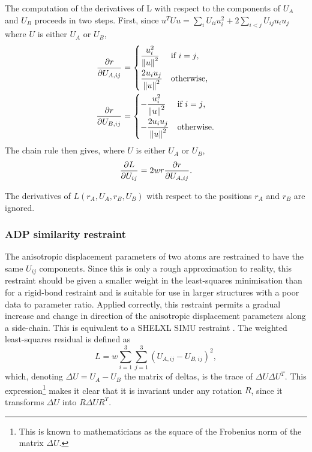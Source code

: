 \documentclass[pdf]{iucr}
\begin{document}
The computation of the derivatives of L with respect to the components of $U_A$ and $U_B$ proceeds in two steps. First, since $u^T U u = \sum_i U_{ii} u_i^2 + 2\sum_{i<j} U_{ij}u_i u_j$ where $U$ is either $U_A$ or $U_B$, 
\begin{align}
\frac{\partial r}{\partial U_{A,ij}} &= \begin{cases}
 \displaystyle \frac{u_i^2}{\left\| u \right\|^2} & \text{if $i=j$,}\\[1em]
 \displaystyle \frac{2u_i u_j}{\left\| u \right\|^2} & \text{otherwise,}
 \end{cases}\\
\frac{\partial r}{\partial U_{B,ij}} &= \begin{cases}
 \displaystyle -\frac{u_i^2}{\left\| u \right\|^2} & \text{if $i=j$,}\\[1em]
 \displaystyle -\frac{2u_i u_j}{\left\| u \right\|^2} & \text{otherwise.}
 \end{cases}
\end{align}
The chain rule then gives, where $U$ is either $U_A$ or $U_B$,
\begin{equation}
\frac{\partial L}{\partial U_{ij}} = 2wr \frac{\partial r}{\partial U_{A,ij}}.
\end{equation}

The derivatives of $L(r_A, U_A, r_B, U_B)$ with respect to the positions $r_A$ and $r_B$ are ignored.

\subsubsection{ADP similarity restraint}
\label{ADP:similarity}
The anisotropic displacement parameters of two atoms are restrained to have the same $U_{ij}$ components. Since this is only a rough approximation to reality, this restraint should be given a smaller weight in the least-squares minimisation than for a rigid-bond restraint and is suitable for use in larger structures with a poor data to parameter ratio. Applied correctly, this restraint permits a gradual increase and change in direction of the anisotropic displacement parameters along a side-chain. This is equivalent to a SHELXL SIMU restraint \cite{Sheldrick:1997aa}.
The weighted least-squares residual is defined as
\begin{equation}
\label{eqn:ADP:restraints:similarity}
L = w \sum_{i=1}^3 \sum_{j=1}^3 (U_{A,ij} - U_{B,ij})^2,
\end{equation}
which, denoting $\Delta U=U_A - U_B$ the matrix of deltas, is the trace of $\Delta U \Delta U^T$. This expression\footnote{This is known to mathematicians as the square of the Frobenius norm of the matrix $\Delta U$.} makes it clear that it is invariant under any rotation $R$, since it transforms $\Delta U$ into $R\Delta U R^T$. 
\end{document}
